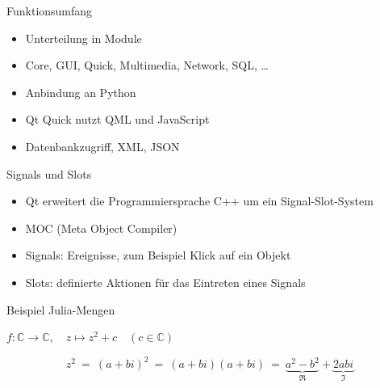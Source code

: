 \documentclass[aspectratio=169]{beamer}
\begin{document}

\begin{frame}{Funktionsumfang}
\begin{itemize}
\item Unterteilung in Module
\item[\ding{237}] Core, GUI, Quick, Multimedia, Network, SQL, \ldots
\item Anbindung an Python
\item Qt Quick nutzt QML und JavaScript
\item Datenbankzugriff, XML, JSON
\end{itemize}
\end{frame}


\begin{frame}{Signals und Slots}
\begin{itemize}
\item Qt erweitert die Programmiersprache C++ um ein Signal-Slot-System
\item[\ding{237}] MOC (Meta Object Compiler)
\item[\ding{237}] Signals: Ereignisse, zum Beispiel Klick auf ein Objekt
\item[\ding{237}] Slots: definierte Aktionen für das Eintreten eines Signals
\end{itemize}
\end{frame}


\begin{frame}{Beispiel Julia-Mengen}
\begin{center}
{\Large \(f : \mathbb{C} \rightarrow \mathbb{C}, \quad z \mapsto z^2+c \quad (c \in \mathbb{C})\)}
\end{center}

\[ z^2 ~=~ (a+bi)^2 ~=~ (a+bi)(a+bi) ~=~ \underbrace{a^2 - b^2}_\Re + \underbrace{2abi}_\Im \]
\end{frame}


\end{document}
